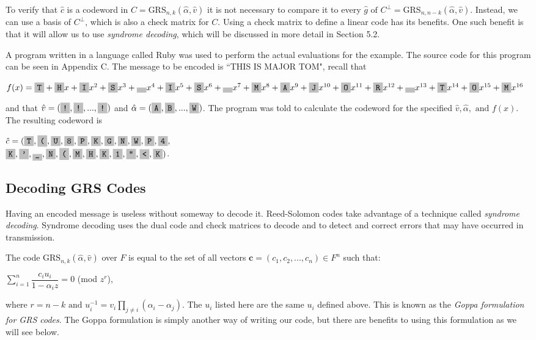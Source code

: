 \documentclass{article}
\begin{document}
To verify that $\hat{c}$ is a codeword in $C = \text{GRS}_{n,k}(\hat{\alpha}, \hat{v})$ it is not necessary to compare it to every $\hat{g} \text{ of } C^{\perp} = \text{GRS}_{n,n-k}(\hat{\alpha}, \hat{v})$. Instead, we can use a basis of $C^{\perp}$, which is also a check matrix for $C$. Using a check matrix to define a linear code has its benefits. One such benefit is that it will allow us to use \textit{syndrome decoding}, which will be discussed in more detail in Section 5.2.

A program written in a language called Ruby was used to perform the actual evaluations for the example. The source code for this program can be seen in Appendix C. The message to be encoded is ``THIS IS MAJOR TOM", recall that 
\begin{center}
$f(x) = \f{T} + \f{H}x + \f{I}x^{2} + \f{S}x^{3} + \f{ }x^{4} + \f{I}x^{5} + \f{S}x^{6} + \f{ }x^{7} + \f{M}x^{8} + \f{A}x^{9} + \f{J}x^{10} + \f{O}x^{11} + \f{R}x^{12} + \f{ }x^{13} + \f{T}x^{14} + \f{O}x^{15} + \f{M}x^{16}$
\end{center}
and that $\hat{v} = (\f{!}, \f{!}, ..., \f{!})$ and $\hat{\alpha} = (\f{A}, \f{B}, ..., \f{W})$. The program was told to calculate the codeword for the specified $\hat{v}, \hat{\alpha}, \text{ and } f(x)$. The resulting codeword is
\begin{center}
$\hat{c} = (\f{T}, \f{(}, \f{U}, \f{8}, \f{P}, \f{K}, \f{G}, \f{N}, \f{W}, \f{P}, \f{4}, $\\
    \hspace*{5ex}   $\f{K}, \f{'}, \f{\_}, \f{N}, \f{(}, \f{M}, \f{H}, \f{K}, \f{1}, \f{"}, \f{<}, \f{K})$.
\end{center}


\subsection{Decoding GRS Codes}
Having an encoded message is useless without someway to decode it. Reed-Solomon codes take advantage of a technique called \textit{syndrome decoding}. Syndrome decoding uses the dual code and check matrices to decode and to detect and correct errors that may have occurred in transmission.

The code $\text{GRS}_{n,k}(\hat{\alpha}, \hat{v})$ over $F$ is equal to the set of all vectors $\textbf{c} = (c_{1},c_{2},...,c_{n}) \in F^{n}$ such that:
\begin{center}
$\sum\limits_{i = 1}^{n} \dfrac{c_{i}u_{i}}{1 - \alpha_{i}z} = 0$ (mod $z^{r}$),
\end{center}
where $r = n - k \text{ and } u_{i}^{-1} = v_{i}\prod\limits_{j \neq i} (\alpha_{i} - \alpha_{j})$. The $u_{i}$ listed here are the same $u_{i}$ defined above.  This is known as the \textit{Goppa formulation for GRS codes}. The Goppa formulation is simply another way of writing our code, but there are benefits to using this formulation as we will see below.
\end{document}

